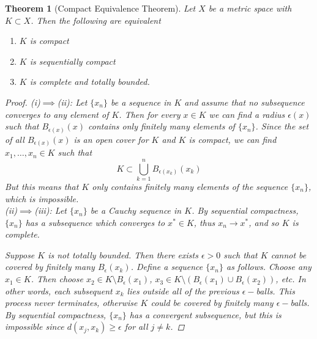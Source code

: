 \documentclass[10pt]{article}         %
\newtheorem{theorem}{Theorem}[section]
\theoremstyle{remark}
\begin{document}
\begin{theorem}[Compact Equivalence Theorem]
Let $X$ be a metric space with $K \subset X$. Then the following are equivalent
\begin{enumerate}[label=(\roman*)]
\item $K$ is compact
\item $K$ is sequentially compact
\item $K$ is complete and totally bounded.
\end{enumerate}

\begin{proof}
(i)$\implies$(ii): Let $\{x_n\}$ be a sequence in $K$ and assume that no subsequence converges to any element of $K$. Then for every $x \in K$ we can find a radius $\epsilon(x)$ such that $B_{\epsilon(x)}(x)$ contains only finitely many elements of $\{x_n\}$. Since the set of all $B_{\epsilon(x)}(x)$ is an open cover for $K$ and $K$ is compact, we can find $x_1, \dots, x_n \in K$ such that 
\[
K \subset \bigcup_{k=1}^n B_{\epsilon(x_k)}(x_k)
\]
But this means that $K$ only contains finitely many elements of the sequence $\{x_n\}$, which is impossible.\\

(ii)$\implies$(iii): Let $\{x_n\}$ be a Cauchy sequence in $K$. By sequential compactness, $\{x_n\}$ has a subsequence which converges to $x^* \in K$, thus $x_n \rightarrow x^*$, and so $K$ is complete.

Suppose $K$ is not totally bounded. Then there exists $\epsilon > 0$ such that $K$ cannot be covered by finitely many $B_\epsilon(x_k)$. Define a sequence $\{x_n\}$ as follows. Choose any $x_1 \in K$. Then choose $x_2 \in K\setminus B_\epsilon(x_1)$, $x_3 \in K\setminus (B_\epsilon(x_1) \cup B_\epsilon(x_2))$, etc. In other words, each subsequent $x_k$ lies outside all of the previous $\epsilon-$balls. This process never terminates, otherwise $K$ could be covered by finitely many $\epsilon-$balls. By sequential compactness, $\{x_n\}$ has a convergent subsequence, but this is impossible since $d(x_j, x_k) \geq \epsilon$ for all $j \neq k$.


\end{proof}
\end{theorem}
\end{document}
